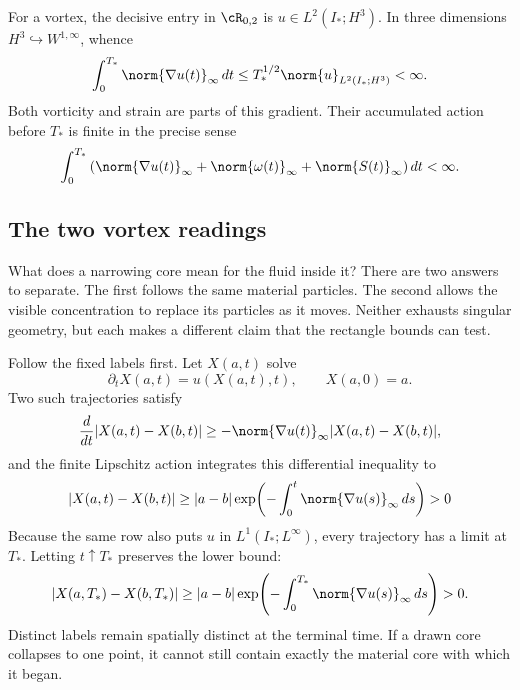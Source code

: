 For a vortex, the decisive entry in \(\cR_{0,2}\) is
\(u\in L^2(I_*;H^3)\).  In three dimensions
\(H^3\hookrightarrow W^{1,\infty}\), whence
\[
  \int_0^{T_*}\norm{\nabla u(t)}_\infty\,dt
  \leq
  T_*^{1/2}\norm{u}_{L^2(I_*;H^3)}<\infty.
\]
Both vorticity and strain are parts of this gradient.  Their accumulated action
before \(T_*\) is finite in the precise sense
\begin{equation}\label{eq:FiniteLipschitzVorticityStrainAction}
  \int_0^{T_*}
  \left(
    \norm{\nabla u(t)}_\infty
    +\norm{\omega(t)}_\infty
    +\norm{S(t)}_\infty
  \right)dt
  <\infty.
\end{equation}

\subsection{The two vortex readings}\label{sub:ClosingCriticalHeightZenoAndTheVortex}

What does a narrowing core mean for the fluid inside it?
There are two answers to separate.  The first follows the same material
particles.  The second allows the visible concentration to replace its
particles as it moves.  Neither exhausts singular geometry, but each makes a
different claim that the rectangle bounds can test.

Follow the fixed labels first.
Let \(X(a,t)\) solve
\[
  \partial_tX(a,t)=u(X(a,t),t),
  \qquad
  X(a,0)=a.
\]
Two such trajectories satisfy
\[
  \frac d{dt}|X(a,t)-X(b,t)|
  \geq
  -\norm{\nabla u(t)}_\infty|X(a,t)-X(b,t)|,
\]
and the finite Lipschitz action integrates this differential inequality to
\begin{equation}\label{eq:BodyMaterialCoreLowerBound}
  |X(a,t)-X(b,t)|
  \geq
  |a-b|
  \exp\!\left(
    -\int_0^t\norm{\nabla u(s)}_\infty\,ds
  \right)
  >0
\end{equation}
Because the same row also puts \(u\) in \(L^1(I_*;L^\infty)\), every trajectory
has a limit at \(T_*\).  Letting \(t\uparrow T_*\) preserves the lower bound:
\[
  |X(a,T_*)-X(b,T_*)|
  \geq |a-b|\exp\!\left(-\int_0^{T_*}\norm{\nabla u(s)}_\infty\,ds\right)>0.
\]
Distinct labels remain spatially distinct at the terminal time.
If a drawn core collapses to one point, it cannot still contain exactly the
material core with which it began.

